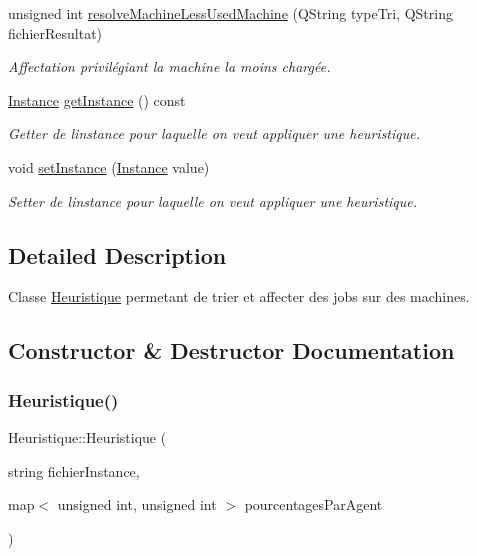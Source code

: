 \begin{DoxyCompactItemize}
unsigned int \hyperlink{classHeuristique_aee20a4baec95a33533a6e13029c437df}{resolve\+Machine\+Less\+Used\+Machine} (Q\+String type\+Tri, Q\+String fichier\+Resultat)
\begin{DoxyCompactList}\small\item\em Affectation privilégiant la machine la moins chargée. \end{DoxyCompactList}\item 
\hyperlink{classInstance}{Instance} \hyperlink{classHeuristique_aa6eca6703702298968f03ac30c4be86f}{get\+Instance} () const
\begin{DoxyCompactList}\small\item\em Getter de l\textquotesingle{}instance pour laquelle on veut appliquer une heuristique. \end{DoxyCompactList}\item 
void \hyperlink{classHeuristique_a06be9aa588fa801a9a4fb19f8ea79179}{set\+Instance} (\hyperlink{classInstance}{Instance} value)
\begin{DoxyCompactList}\small\item\em Setter de l\textquotesingle{}instance pour laquelle on veut appliquer une heuristique. \end{DoxyCompactList}\end{DoxyCompactItemize}


\subsection{Detailed Description}
Classe \hyperlink{classHeuristique}{Heuristique} permetant de trier et affecter des jobs sur des machines. 

\subsection{Constructor \& Destructor Documentation}
\mbox{\label{classHeuristique_a6d5f8c9f55e42a8713c8a5636d9cef1b}} 
\subsubsection{\texorpdfstring{Heuristique()}{Heuristique()}}
{\footnotesize\ttfamily Heuristique\+::\+Heuristique (\begin{DoxyParamCaption}\item[{string}]{fichier\+Instance,  }\item[{map$<$ unsigned int, unsigned int $>$}]{pourcentages\+Par\+Agent }\end{DoxyParamCaption})}



